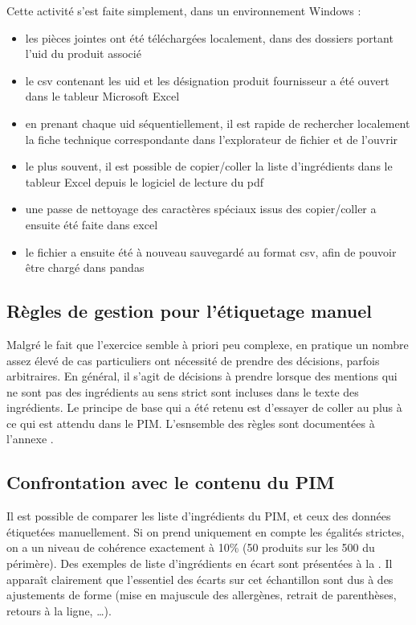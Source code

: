             Cette activité s'est faite simplement, dans un environnement Windows : 
            \begin{itemize}
                \item les pièces jointes ont été téléchargées localement, dans des dossiers portant l'uid du produit associé
                \item le csv contenant les uid et les désignation produit fournisseur a été ouvert dans le tableur Microsoft Excel
                \item en prenant chaque uid séquentiellement, il est rapide de rechercher localement la fiche technique correspondante dans l'explorateur de fichier et de l'ouvrir
                \item le plus souvent, il est possible de copier/coller la liste d'ingrédients dans le tableur Excel depuis le logiciel de lecture du pdf
                \item  une passe de nettoyage des caractères spéciaux issus des copier/coller a ensuite été faite dans excel
                \item le fichier a ensuite été à nouveau sauvegardé au format csv, afin de pouvoir être chargé dans pandas
            \end{itemize}

            \subsection{Règles de gestion pour l'étiquetage manuel}
        
            Malgré le fait que l'exercice semble à priori peu complexe, en pratique un nombre assez élevé de cas particuliers ont nécessité de prendre des décisions, parfois arbitraires.
            En général, il s'agit de décisions à prendre lorsque des mentions qui ne sont pas des ingrédients au sens strict sont incluses dans le texte des ingrédients.
            Le principe de base qui a été retenu est d'essayer de coller au plus à ce qui est attendu dans le PIM. 
            L'esnsemble des règles sont documentées à l'annexe .

            \subsection{Confrontation avec le contenu du PIM}
            \label{ingredient_comparison}
            Il est possible de comparer les liste d'ingrédients du PIM, et ceux des données étiquetées manuellement.
            Si on prend uniquement en compte les égalités strictes, on a un niveau de cohérence exactement à 10\% (50 produits sur les 500 du périmère).
            Des exemples de liste d'ingrédients en écart sont présentées à la .
            Il apparaît clairement que l'essentiel des écarts sur cet échantillon sont dus à des ajustements de forme (mise en majuscule des allergènes, retrait de parenthèses, retours à la ligne, \dots).

